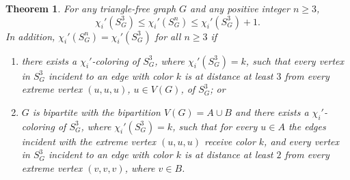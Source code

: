 \documentclass{article}
\newtheorem{theorem}{Theorem}[section]
\begin{document}
\begin{theorem}
\label{thm:triangle-free}
For any triangle-free graph $G$ and any positive integer $n\ge 3$,
	$$\chi_i'(S_G^3)\le \chi_i'(S_G^n)\le \chi_i'(S_G^3)+1.$$
In addition, $\chi_i'(S_G^n)=\chi_i'(S_G^3)$ for all $n\ge 3$ if
\begin{enumerate}[label=(\roman*),noitemsep]
    \item there exists a $\chi_i'$-coloring of $S_G^3$, where $\chi_i'(S_G^3)=k$, such that every vertex in $S_G^3$ incident to an edge with color $k$ is at distance at least $3$ from every extreme vertex $(u,u,u)$, $u\in V(G)$, of $S_G^3$; or
    \item $G$ is bipartite with the bipartition $V(G)=A\cup B$ and there exists a $\chi_i'$-coloring of $S_G^3$, where $\chi_i'(S_G^3)=k$, such that for every $u\in A$ the edges incident with the extreme vertex $(u,u,u)$ receive color $k$, and every vertex in $S_G^3$ incident to an edge with color $k$ is at distance at least $2$ from every extreme vertex $(v,v,v)$, where $v\in B$.
\end{enumerate}
\label{thm:SG3}
\end{theorem}
\end{document}
